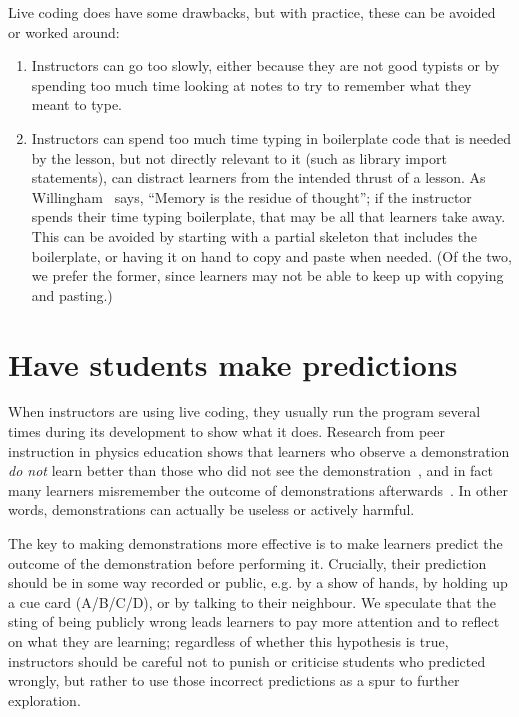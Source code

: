 \documentclass[10pt,letterpaper]{article}
\newcommand{\rulemajor}[2]{\section{#1}\label{#2}}
\begin{document}
Live coding does have some drawbacks, but with practice, these can be
avoided or worked around:

\begin{enumerate}

\item Instructors can go too slowly, either because they are not good
  typists or by spending too much time looking at notes to try to
  remember what they meant to type.

\item Instructors can spend too much time typing in boilerplate code
  that is needed by the lesson, but not directly relevant to it (such
  as library import statements), can distract learners from the
  intended thrust of a lesson.  As Willingham~\cite{willingham-book} says,
  ``Memory is the residue of thought''; if the instructor spends their
  time typing boilerplate, that may be all that learners take away.
  This can be avoided by starting with a partial skeleton that
  includes the boilerplate, or having it on hand to copy and paste
  when needed.  (Of the two, we prefer the former, since learners
  may not be able to keep up with copying and pasting.)

\end{enumerate}

\rulemajor{Have students make predictions}{predictions}

When instructors are using live coding, they usually run the program
several times during its development to show what it does.  Research
from peer instruction in physics education shows that learners who
observe a demonstration \textit{do not} learn better than those who
did not see the demonstration~\cite{crouch-demo}, and in fact many
learners misremember the outcome of demonstrations
afterwards~\cite{miller-demo}.  In other words, demonstrations can
actually be useless or actively harmful.

The key to making demonstrations more effective is
to make learners predict the outcome of the demonstration before performing it.
Crucially, their prediction should be in some way recorded or public,
e.g. by a show of hands,
by holding up a cue card (A/B/C/D),
or by talking to their neighbour.
We speculate that the sting of being publicly wrong leads learners to pay more attention
and to reflect on what they are learning;
regardless of whether this hypothesis is true,
instructors should be careful not to punish or criticise students who predicted wrongly,
but rather to use those incorrect predictions as a spur to further exploration.
\end{document}
